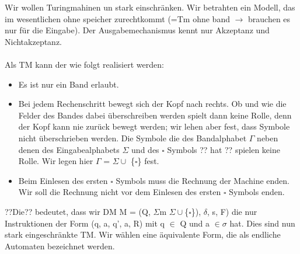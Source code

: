 Wir wollen Turingmahinen un stark einschränken. Wir betrahten ein Modell, das im wesentlichen ohne speicher
zurechtkommt (=Tm ohne band $\longrightarrow$  brauchen es nur für die Eingabe).
Der Ausgabemechanismus kennt nur Akzeptanz und Nichtakzeptanz.\\\\
Als TM kann der wie folgt realisiert werden:
\begin{itemize}
    \item Es ist nur ein Band erlaubt.
    \item Bei jedem Rechenschritt bewegt sich der Kopf nach rechts. Ob und wie die Felder des Bandes dabei überschreiben werden spielt dann keine Rolle, denn der Kopf kann nie zurück bewegt werden; wir lehen aber fest, dass Symbole nicht überschrieben werden. Die Symbole die des Bandalphabet $\Gamma $ neben denen des Eingabealphabets $\Sigma $ und des $\square $  Symbols ?? hat ?? spielen keine Rolle. Wir legen hier $\varGamma $ = $\Sigma \cup $ \{$\square $\} fest.
    \item Beim Einlesen des ersten $\square $ Symbols muss die Rechnung der Machine enden. Wir soll die Rechnung nicht vor dem Einlesen des ersten $\square $ Symbols enden. 
\end{itemize}
??Die?? bedeutet, dass wir DM M = (Q, $\Sigma$m $\Sigma\cup $\{$\square $\}), $\delta$, s, F) die nur Instruktionen der Form (q, a, q', a, R) mit q $\in$ Q und a $\in \sigma$ hat.
Dies sind nun stark eingeschränkte TM. Wir wählen eine äquivalente Form, die als endliche Automaten bezeichnet werden. 

